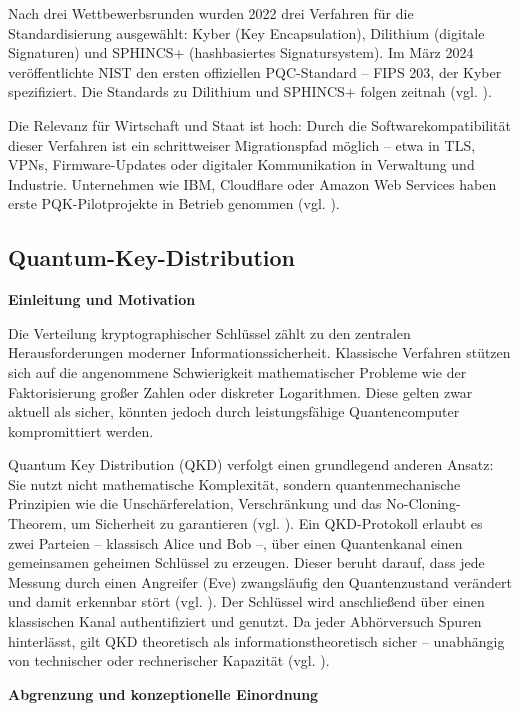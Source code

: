 Nach drei Wettbewerbsrunden wurden 2022 drei Verfahren für die Standardisierung ausgewählt: Kyber (Key Encapsulation), Dilithium (digitale Signaturen) und SPHINCS+ (hashbasiertes Signatursystem). Im März 2024 veröffentlichte NIST den ersten offiziellen PQC-Standard – FIPS 203, der Kyber spezifiziert. Die Standards zu Dilithium und SPHINCS+ folgen zeitnah (vgl. \cite{nist_fips_2024}).


Die Relevanz für Wirtschaft und Staat ist hoch: Durch die Softwarekompatibilität dieser Verfahren ist ein schrittweiser Migrationspfad möglich – etwa in TLS, VPNs, Firmware-Updates oder digitaler Kommunikation in Verwaltung und Industrie. Unternehmen wie IBM, Cloudflare oder Amazon Web Services haben erste PQK-Pilotprojekte in Betrieb genommen (vgl. \cite{alagic_g_et_al_status_2023}).
 

\subsection{Quantum-Key-Distribution}
\textbf{Einleitung und Motivation}


Die Verteilung kryptographischer Schlüssel zählt zu den zentralen Herausforderungen moderner Informationssicherheit. Klassische Verfahren stützen sich auf die angenommene Schwierigkeit mathematischer Probleme wie der Faktorisierung großer Zahlen oder diskreter Logarithmen. Diese gelten zwar aktuell als sicher, könnten jedoch durch leistungsfähige Quantencomputer kompromittiert werden.


Quantum Key Distribution (QKD) verfolgt einen grundlegend anderen Ansatz: Sie nutzt nicht mathematische Komplexität, sondern quantenmechanische Prinzipien wie die Unschärferelation, Verschränkung und das No-Cloning-Theorem, um Sicherheit zu garantieren (vgl. \cite{scarani_et_al_security_2009}).
Ein QKD-Protokoll erlaubt es zwei Parteien – klassisch Alice und Bob –, über einen Quantenkanal einen gemeinsamen geheimen Schlüssel zu erzeugen. Dieser beruht darauf, dass jede Messung durch einen Angreifer (Eve) zwangsläufig den Quantenzustand verändert und damit erkennbar stört (vgl. \cite{bennett_et_al_quantum_1984}).
Der Schlüssel wird anschließend über einen klassischen Kanal authentifiziert und genutzt. Da jeder Abhörversuch Spuren hinterlässt, gilt QKD theoretisch als informationstheoretisch sicher – unabhängig von technischer oder rechnerischer Kapazität (vgl. \cite{ekert_et_al_quantum_1991}).


\vspace{1em}
\textbf{Abgrenzung und konzeptionelle Einordnung}


